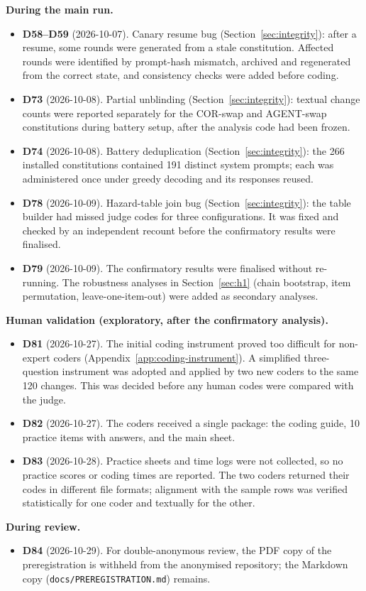 \noindent\textbf{During the main run.}
\begin{itemize}
\item \textbf{D58--D59} (2026-10-07). Canary resume bug (Section~\ref{sec:integrity}): after a resume, some rounds were generated from a stale constitution. Affected rounds were identified by prompt-hash mismatch, archived and regenerated from the correct state, and consistency checks were added before coding.
\item \textbf{D73} (2026-10-08). Partial unblinding (Section~\ref{sec:integrity}): textual change counts were reported separately for the COR-swap and AGENT-swap constitutions during battery setup, after the analysis code had been frozen.
\item \textbf{D74} (2026-10-08). Battery deduplication (Section~\ref{sec:integrity}): the 266 installed constitutions contained 191 distinct system prompts; each was administered once under greedy decoding and its responses reused.
\item \textbf{D78} (2026-10-09). Hazard-table join bug (Section~\ref{sec:integrity}): the table builder had missed judge codes for three configurations. It was fixed and checked by an independent recount before the confirmatory results were finalised.
\item \textbf{D79} (2026-10-09). The confirmatory results were finalised without re-running. The robustness analyses in Section~\ref{sec:h1} (chain bootstrap, item permutation, leave-one-item-out) were added as secondary analyses.
\end{itemize}

\noindent\textbf{Human validation (exploratory, after the confirmatory analysis).}
\begin{itemize}
\item \textbf{D81} (2026-10-27). The initial coding instrument proved too difficult for non-expert coders (Appendix~\ref{app:coding-instrument}). A simplified three-question instrument was adopted and applied by two new coders to the same 120 changes. This was decided before any human codes were compared with the judge.
\item \textbf{D82} (2026-10-27). The coders received a single package: the coding guide, 10 practice items with answers, and the main sheet.
\item \textbf{D83} (2026-10-28). Practice sheets and time logs were not collected, so no practice scores or coding times are reported. The two coders returned their codes in different file formats; alignment with the sample rows was verified statistically for one coder and textually for the other.
\end{itemize}

\noindent\textbf{During review.}
\begin{itemize}
\item \textbf{D84} (2026-10-29). For double-anonymous review, the PDF copy of the preregistration is withheld from the anonymised repository; the Markdown copy (\texttt{docs/PREREGISTRATION.md}) remains.
\end{itemize}
